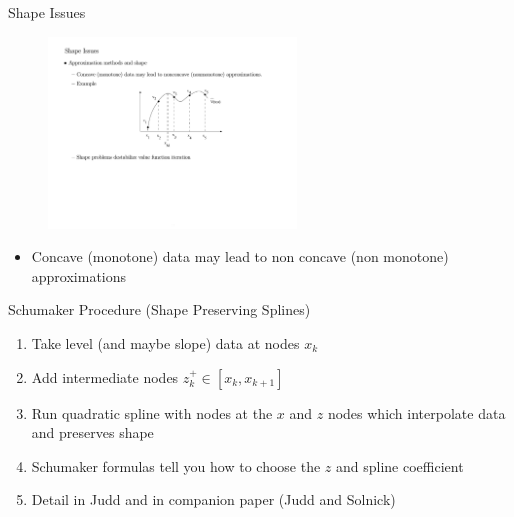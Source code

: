 \documentclass[11pt,handout,xcolor=pdftex,dvipsnames,table,mathserif,aspectratio=169]{beamer}
\begin{document}
\begin{frame}{Shape Issues}
\begin{figure}[htbp]
\begin{center}
\includegraphics[height=2in]{./resources/spline_textbook.pdf}
\label{default}
\end{center}
\end{figure}
\begin{itemize}
\item Concave (monotone) data may lead to non concave (non monotone) approximations
\end{itemize}
\end{frame}

\begin{frame}{Schumaker Procedure (Shape Preserving Splines)}
\begin{enumerate}
\item Take level (and maybe slope) data at nodes $x_k$
\item Add intermediate nodes $z_k^{+} \in [x_k,x_{k+1}]$
\item Run quadratic spline with nodes at the $x$ and $z$ nodes which interpolate data and preserves shape
\item Schumaker formulas tell you how to choose the $z$ and spline coefficient
\item Detail in Judd and in companion paper (Judd and Solnick)
\end{enumerate}
\end{frame}
\end{document}
